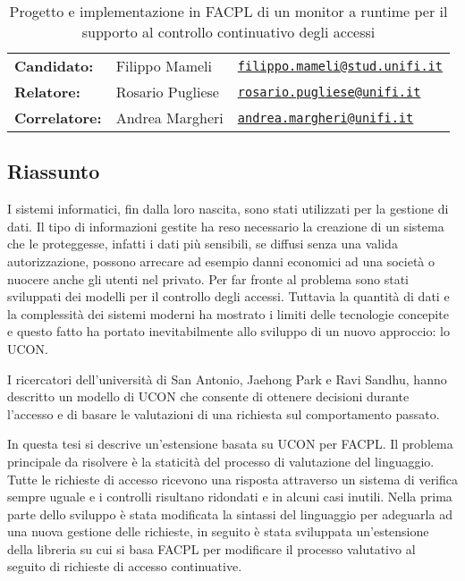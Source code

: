 \documentclass{article}
\begin{document}
\begin{table}[]
\centering
\caption*{Progetto e implementazione in FACPL di un monitor a runtime per il supporto al controllo continuativo degli accessi}
\begin{tabular}{lll}
\textbf{Candidato:}   & Filippo Mameli & \href{mailto:filippo.mameli@stud.unifi.it}{\texttt{filippo.mameli@stud.unifi.it}}  \\
\textbf{Relatore:}    & Rosario Pugliese  & \href{mailto:rosario.pugliese@unifi.it}{\texttt{rosario.pugliese@unifi.it}}                           \\
\textbf{Correlatore:} & Andrea Margheri   & \href{mailto:andrea.margheri@unifi.it}{\texttt{andrea.margheri@unifi.it}}
\end{tabular}
\end{table}
\subsection*{Riassunto}
I sistemi informatici, fin dalla loro nascita, sono stati utilizzati per la gestione di dati.
Il tipo di informazioni gestite ha reso necessario la creazione di un sistema che le proteggesse, infatti i
dati più sensibili, se diffusi senza una valida autorizzazione, possono arrecare ad esempio danni economici
ad una società o nuocere anche gli utenti nel privato.
Per far fronte al problema sono stati sviluppati dei modelli per il controllo degli accessi. Tuttavia la quantità di dati
e la complessità dei sistemi moderni ha mostrato i limiti delle tecnologie concepite e questo fatto ha portato inevitabilmente
allo sviluppo di un nuovo approccio: lo UCON.

I ricercatori dell'università di San Antonio, Jaehong Park e Ravi Sandhu, hanno descritto un modello
di UCON che consente di ottenere decisioni durante l'accesso e di basare le valutazioni di una richiesta
sul comportamento passato.

In questa tesi si descrive un'estensione basata su UCON per FACPL.
Il problema principale da risolvere è la staticità del processo di valutazione del linguaggio.
Tutte le richieste di accesso ricevono una risposta attraverso un sistema di verifica sempre uguale e i controlli
risultano ridondati e in alcuni casi inutili.
Nella prima parte dello sviluppo è stata modificata la sintassi del linguaggio per adeguarla ad una nuova
gestione delle richieste, in seguito
è stata sviluppata un'estensione della libreria su cui si basa FACPL per modificare
il processo valutativo al seguito di richieste di accesso continuative.
\end{document}
